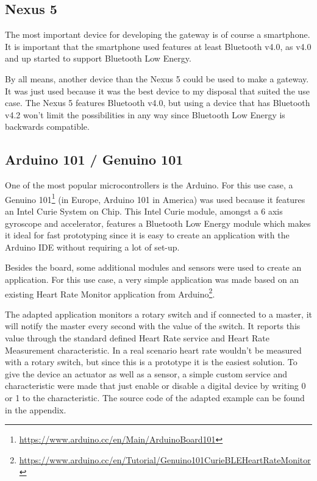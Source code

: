 \documentclass[pdftex,a4paper,12pt,twoside]{report}
\begin{document}
\subsection{Nexus 5}
\label{subsec:nexus}
The most important device for developing the gateway is of course a smartphone. It is important that the smartphone used features at least Bluetooth v4.0, as v4.0 and up started to support Bluetooth Low Energy.

By all means, another device than the Nexus 5 could be used to make a gateway. It was just used because it was the best device to my disposal that suited the use case. The Nexus 5 features Bluetooth v4.0, but using a device that has Bluetooth v4.2 won't limit the possibilities in any way since Bluetooth Low Energy is backwards compatible.

\subsection{Arduino 101 / Genuino 101}
\label{subsec:arduino101}
One of the most popular microcontrollers is the Arduino. For this use case, a Genuino 101\footnote{\url{https://www.arduino.cc/en/Main/ArduinoBoard101}} (in Europe, Arduino 101 in America) was used because it features an Intel Curie System on Chip. This Intel Curie module, amongst a 6 axis gyroscope and accelerator, features a Bluetooth Low Energy module which makes it ideal for fast prototyping since it is easy to create an application with the Arduino IDE without requiring a lot of set-up.

Besides the board, some additional modules and sensors were used to create an application. For this use case, a very simple application was made based on an existing Heart Rate Monitor application from Arduino\footnote{\url{https://www.arduino.cc/en/Tutorial/Genuino101CurieBLEHeartRateMonitor}}.

The adapted application monitors a rotary switch and if connected to a master, it will notify the master every second with the value of the switch. It reports this value through the standard defined Heart Rate service and Heart Rate Measurement characteristic. In a real scenario heart rate wouldn't be measured with a rotary switch, but since this is a prototype it is the easiest solution. To give the device an actuator as well as a sensor, a simple custom service and characteristic were made that just enable or disable a digital device by writing 0 or 1 to the characteristic. The source code of the adapted example can be found in the appendix.
\end{document}
